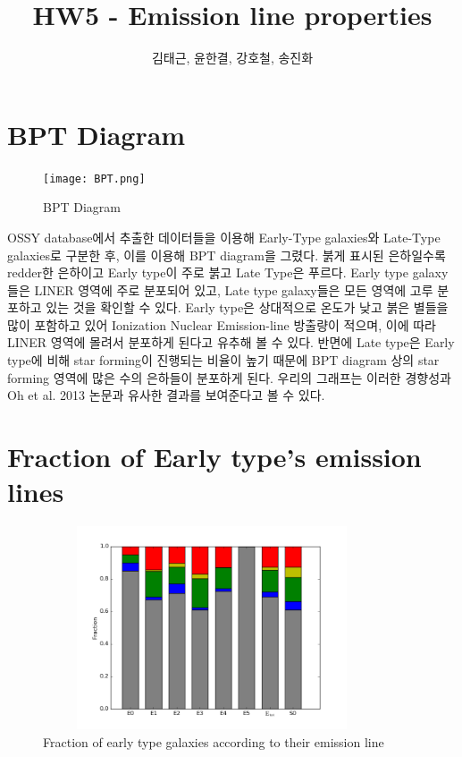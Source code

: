 \documentclass[a4paper,11pt]{article}
\title{\boldmath HW5 - Emission line properties}
\author{김태근, 윤한결, 강호철, 송진화}
\affiliation{연세대학교 천문우주학과 F조}
\begin{document}
 
\maketitle
\flushbottom

\section{BPT Diagram}
\label{sec:result}


\begin{figure}[h]
\centering
\texttt{[image: BPT.png]}
\caption{\label{fig:i} BPT Diagram}
\end{figure}

OSSY database에서 추출한 데이터들을 이용해 Early-Type galaxies와 Late-Type galaxies로 구분한 후, 이를 이용해 BPT diagram을 그렸다. 붉게 표시된 은하일수록 redder한 은하이고 Early type이 주로 붉고 Late Type은 푸르다.
Early type galaxy들은 LINER 영역에 주로 분포되어 있고, Late type galaxy들은 모든 영역에 고루 분포하고 있는 것을 확인할 수 있다.
Early type은 상대적으로 온도가 낮고 붉은 별들을 많이 포함하고 있어 Ionization Nuclear Emission-line 방출량이 적으며, 이에 따라 LINER 영역에 몰려서 분포하게 된다고 유추해 볼 수 있다.
반면에 Late type은 Early type에 비해 star forming이 진행되는 비율이 높기 때문에 BPT diagram 상의 star forming 영역에 많은 수의 은하들이 분포하게 된다. 
우리의 그래프는 이러한 경향성과 Oh et al. 2013 논문과 유사한 결과를 보여준다고 볼 수 있다.

\section{Fraction of Early type's emission lines}

\begin{figure}[h]
\centering
\includegraphics[height=60mm, width=100mm]{Earlybar.png}
\caption{\label{fig:ii}  Fraction of early type galaxies according to their emission line }
\end{figure}
\end{document}
